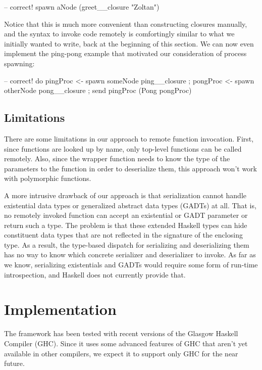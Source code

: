 \documentclass[preprint]{sigplanconf}
\begin{document}
\begin{code}
-- correct!
spawn aNode (greet__closure "Zoltan")
\end{code}

Notice that this is much more convenient than constructing closures manually, and the syntax to invoke code remotely is comfortingly similar to what we initially wanted to write, back at the beginning of this section. We can now even implement the ping-pong example that motivated our consideration of process spawning:

\begin{code}
-- correct!
do { pingProc <- spawn someNode ping__closure
   ; pongProc <- spawn otherNode pong__closure
   ; send pingProc (Pong pongProc) }
\end{code}

\subsection{Limitations}

There are some limitations in our approach to remote function invocation. First, since functions are looked up by name, only top-level functions can be called remotely. Also, since the wrapper function needs to know the type of the parameters to the function in order to deserialize them, this approach won't work with polymorphic functions.

A more intrusive drawback of our approach is that serialization cannot handle existential data types or generalized abstract data types (GADTs) at all. That is, no remotely invoked function can accept an existential or GADT parameter or return such a type. The problem is that these extended Haskell types can hide constituent data types that are not reflected in the signature of the enclosing type. As a result, the type-based dispatch for serializing and deserializing them has no way to know which concrete serializer and deserializer to invoke. As far as we know, serializing existentials and GADTs would require some form of run-time introspection, and Haskell does not currently provide that.


\section{Implementation}
The framework has been tested with recent versions of the Glasgow Haskell Compiler (GHC). Since it uses some advanced features of GHC that aren't yet available in other compilers, we expect it to support only GHC for the near future.
\end{document}
